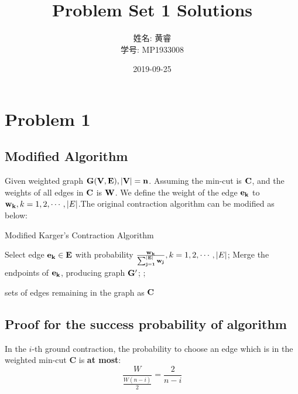 \documentclass[a4paper, 12pt, titlepage]{article}
\title{Problem Set 1 Solutions}
\author{姓名: 黄睿 \\ 学号: MP1933008}
\date{2019-09-25}
\begin{document}
\maketitle

\section{Problem 1}

\subsection{Modified Algorithm}

Given weighted graph ${\bf G(V, E), |V| = n}$. Assuming the min-cut is ${\bf C}$, and the weights of all edges in ${\bf C}$ is ${\bf W}$.
We define the weight of the edge ${\bf e_k}$ to ${\bf w_{k}}, k = 1, 2, \cdots, |E|$.The original contraction algorithm can be modified as below:
\begin{algorithm}[h]
    \caption{Modified Karger's Contraction Algorithm}
    \begin{algorithmic}[1]

            \State Select edge ${\bf e_{k}} \in {\bf E}$ with probability ${\bf \frac{w_{k}}{\sum_{j = 1}^{|E|} w_{j}}}, k = 1, 2, \cdots, |E|$;
            \State Merge the endpoints of ${\bf e_{k}}$, producing graph ${\bf G'}$;
            ;
        \EndWhile

        \State \Return sets of edges remaining in the graph as ${\bf C}$
        \EndFunction
    \end{algorithmic}
\end{algorithm}


\subsection{Proof for the success probability of algorithm}

In the $i$-th ground contraction, the probability to choose an edge which is in the weighted min-cut {\bf C} is {\bf at most}:
\[
    \frac{W}{\frac{W (n - i)}{2}} = \frac{2}{n - i}
\]
\end{document}
